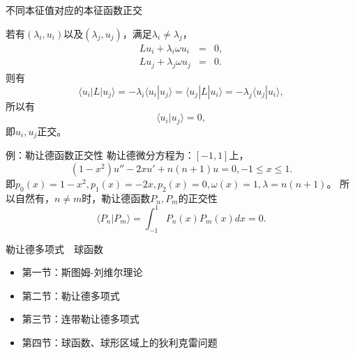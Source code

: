 \documentclass[11pt]{beamer}
\begin{document}
\begin{frame}{不同本征值对应的本征函数正交}

若有$ (\lambda_i, u_i)$以及$(\lambda_j, u_j)$，满足$\lambda_i \neq \lambda_j$，
\begin{eqnarray}
L u_i + \lambda_i \omega u_i &=& 0, \\
L u_j + \lambda_j \omega u_j &=& 0.
\end{eqnarray}
则有
\begin{equation}
\langle u_i | L | u_j \rangle = - \lambda_i \langle u_i | u_j \rangle = \langle u_j | L | u_i \rangle = - \lambda_j \langle u_j | u_i \rangle,
\end{equation}
所以有
\begin{equation}
\langle u_i | u_j \rangle = 0,
\end{equation}
即$u_i, u_j$正交。
\end{frame}

\begin{frame}{例：勒让德函数正交性}
勒让德微分方程为：$[-1,1]$上，
\begin{equation}
(1-x^2) u'' - 2x u' + n(n+1) u = 0, -1 \leq x \leq 1.
\end{equation}
即$p_0 (x) = 1-x^2, p_1(x) = -2x, p_2(x) = 0, \omega(x) = 1, \lambda = n(n+1)$。
所以自然有，$n\neq m$时，勒让德函数$P_n, P_m$的正交性
\begin{equation}
\langle P_n | P_m \rangle = \int^1_{-1} P_n(x) P_m(x) dx = 0.
\end{equation}

\end{frame}

\begin{frame}{勒让德多项式　球函数}
\begin{itemize}
	\item 第一节：斯图姆-刘维尔理论
	\vspace{1cm}
	\item {\color{blue}第二节：勒让德多项式}
	\vspace{1cm}
	\item 第三节：连带勒让德多项式
	\vspace{1cm}
	\item 第四节：球函数、球形区域上的狄利克雷问题
\end{itemize}
\end{frame}
\end{document}

